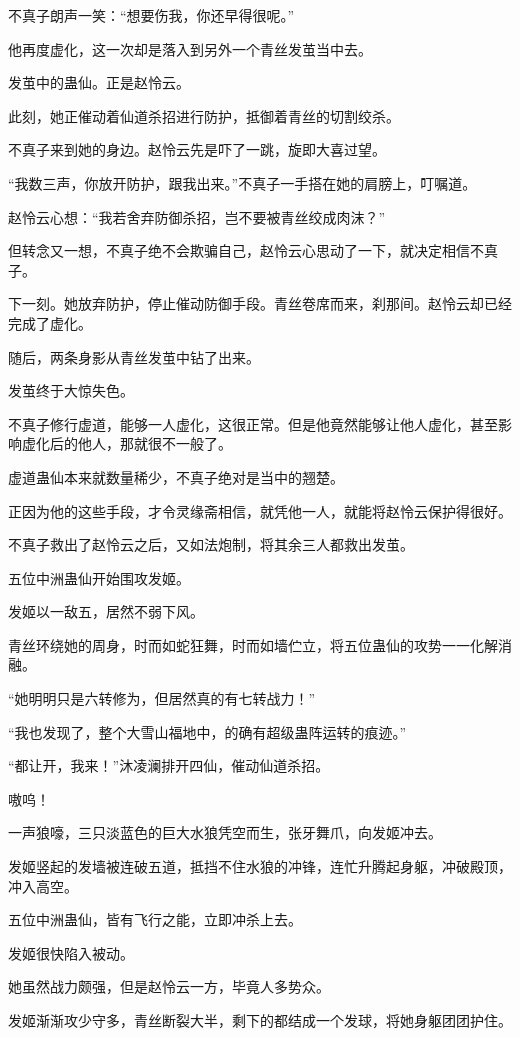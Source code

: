 \begin{this_body}
不真子朗声一笑：“想要伤我，你还早得很呢。”

他再度虚化，这一次却是落入到另外一个青丝发茧当中去。

发茧中的蛊仙。正是赵怜云。

此刻，她正催动着仙道杀招进行防护，抵御着青丝的切割绞杀。

不真子来到她的身边。赵怜云先是吓了一跳，旋即大喜过望。

“我数三声，你放开防护，跟我出来。”不真子一手搭在她的肩膀上，叮嘱道。

赵怜云心想：“我若舍弃防御杀招，岂不要被青丝绞成肉沫？”

但转念又一想，不真子绝不会欺骗自己，赵怜云心思动了一下，就决定相信不真子。

下一刻。她放弃防护，停止催动防御手段。青丝卷席而来，刹那间。赵怜云却已经完成了虚化。

随后，两条身影从青丝发茧中钻了出来。

发茧终于大惊失色。

不真子修行虚道，能够一人虚化，这很正常。但是他竟然能够让他人虚化，甚至影响虚化后的他人，那就很不一般了。

虚道蛊仙本来就数量稀少，不真子绝对是当中的翘楚。

正因为他的这些手段，才令灵缘斋相信，就凭他一人，就能将赵怜云保护得很好。

不真子救出了赵怜云之后，又如法炮制，将其余三人都救出发茧。

五位中洲蛊仙开始围攻发姬。

发姬以一敌五，居然不弱下风。

青丝环绕她的周身，时而如蛇狂舞，时而如墙伫立，将五位蛊仙的攻势一一化解消融。

“她明明只是六转修为，但居然真的有七转战力！”

“我也发现了，整个大雪山福地中，的确有超级蛊阵运转的痕迹。”

“都让开，我来！”沐凌澜排开四仙，催动仙道杀招。

嗷呜！

一声狼嚎，三只淡蓝色的巨大水狼凭空而生，张牙舞爪，向发姬冲去。

发姬竖起的发墙被连破五道，抵挡不住水狼的冲锋，连忙升腾起身躯，冲破殿顶，冲入高空。

五位中洲蛊仙，皆有飞行之能，立即冲杀上去。

发姬很快陷入被动。

她虽然战力颇强，但是赵怜云一方，毕竟人多势众。

发姬渐渐攻少守多，青丝断裂大半，剩下的都结成一个发球，将她身躯团团护住。


\end{this_body}
